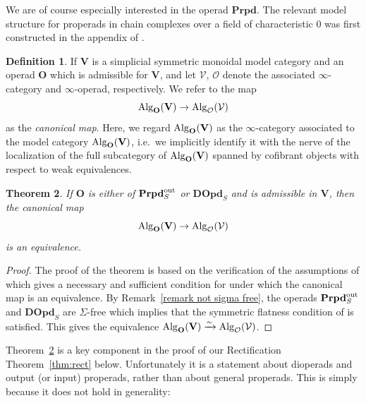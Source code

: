 \documentclass{amsart}
\newtheorem{theorem}{Theorem}
\numberwithin{theorem}{subsection}
\theoremstyle{definition}
\newtheorem{definition}[theorem]{Definition}
\newcommand{\xxO}{\mathcal{O}}
\newcommand{\xV}{\mathcal{V}}
\newcommand{\isoto}{\xrightarrow{\sim}}
\newcommand{\name}[1]{\ensuremath{\text{\textup{#1}}}}
\newcommand{\Alg}{\name{Alg}}
\newcommand{\bfproperad}{\mathbf{Prpd}}
\begin{document}
We are of course especially interested in the operad $\bfproperad$.
The relevant model structure for properads in chain complexes over a field of characteristic 0 was first constructed in the appendix of \cite{MerkulovVallette:DTRP}.

\begin{definition}\label{def canmor}
	If $\mathbf{V}$ is a simplicial symmetric monoidal model category and an operad $\mathbf{O}$ which is admissible for $\mathbf{V}$, and let $\xV$, $\xxO$ denote the associated $\infty$-category and $\infty$-operad, respectively. We refer to the map \[\Alg_{\mathbf{O}}(\mathbf{V})\to \Alg_{\xxO}(\xV) \]
	as the \emph{canonical map}.  
	Here, we regard $\Alg_{\mathbf{O}}(\mathbf{V})$ as the $\infty$-category associated to the model category $\Alg_{\mathbf{O}}(\mathbf{V})$, i.e.\ we implicitly identify it with the nerve of the localization of the full subcategory of $\Alg_{\mathbf{O}}(\mathbf{V})$ spanned by cofibrant objects with respect to weak equivalences.
\end{definition}

\begin{theorem}\label{theo:AlgOpScomp}
If $\mathbf{O}$ is either of $\mathbf{Prpd}^{\name{out}}_S$ or $\mathbf{DOpd}_S$ and is admissible in $\mathbf{V}$, then the canonical map
\[\Alg_{\mathbf{O}}(\mathbf{V})\to \Alg_{\xxO}(\xV) \]
is an equivalence.
\end{theorem}
\begin{proof}
	The proof of the theorem is based on the verification of the assumptions of \cite[Theorem 7.11]{PavlovScholbach} which gives a necessary and sufficient condition for under which the canonical map is an equivalence. 
By Remark~\ref{remark not sigma free}, the operads $\mathbf{Prpd}^{\name{out}}_S$ and $\mathbf{DOpd}_S$ are $\Sigma$-free which implies that the symmetric flatness condition of \cite[Theorem 7.11]{PavlovScholbach} is satisfied. 
This gives the equivalence $\Alg_{\mathbf{O}}(\mathbf{V})\isoto \Alg_{\xxO}(\xV)$.
\end{proof}

Theorem~\ref{theo:AlgOpScomp} is a key component in the proof of our Rectification Theorem~\ref{thm:rect} below.
Unfortunately it is a statement about dioperads and output (or input) properads, rather than about general properads.
This is simply because it does not hold in generality:
\end{document}
